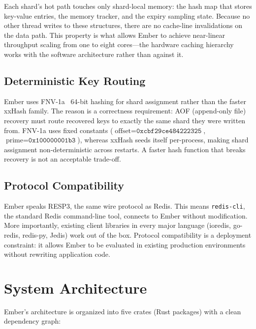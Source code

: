 \documentclass[conference]{IEEEtran}
\begin{document}
Each shard's hot path touches only shard-local memory: the hash map
that stores key-value entries, the memory tracker, and the expiry
sampling state. Because no other thread writes to these structures,
there are no cache-line invalidations on the data path. This property
is what allows Ember to achieve near-linear throughput scaling from
one to eight cores---the hardware caching hierarchy works with the
software architecture rather than against it.

\subsection{Deterministic Key Routing}

Ember uses FNV-1a~\cite{fnv} 64-bit hashing for shard assignment
rather than the faster xxHash family. The reason is a correctness
requirement: AOF (append-only file) recovery must route recovered
keys to exactly the same shard they were written from. FNV-1a uses
fixed constants ($\text{offset} = \texttt{0xcbf29ce484222325}$,
$\text{prime} = \texttt{0x100000001b3}$), whereas xxHash seeds itself
per-process, making shard assignment non-deterministic across restarts.
A faster hash function that breaks recovery is not an acceptable
trade-off.

\subsection{Protocol Compatibility}

Ember speaks RESP3, the same wire protocol as Redis. This means
\texttt{redis-cli}, the standard Redis command-line tool, connects to
Ember without modification. More importantly, existing client
libraries in every major language (ioredis, go-redis, redis-py,
Jedis) work out of the box. Protocol compatibility is a deployment
constraint: it allows Ember to be evaluated in existing production
environments without rewriting application code.


\section{System Architecture}
\label{sec:arch}

Ember's architecture is organized into five crates (Rust packages)
with a clean dependency graph:
\end{document}
